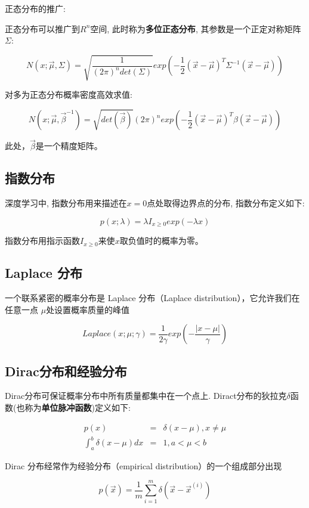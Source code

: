 正态分布的推广: 

正态分布可以推广到$R^n$空间, 此时称为{\bf 多位正态分布}, 其参数是一个正定对称矩阵$\Sigma$: 

$$
N(x;\vec\mu,\Sigma)=\sqrt{\frac{1}{(2\pi)^ndet(\Sigma)}}exp\left(-\frac{1}{2}(\vec{x}-\vec{\mu})^T\Sigma^{-1}(\vec{x}-\vec{\mu})\right)
$$

对多为正态分布概率密度高效求值: 

$$
N(x;\vec{\mu},\vec\beta^{-1}) = \sqrt{det(\vec\beta)}{(2\pi)^n}exp\left(-\frac{1}{2}(\vec{x}-\vec\mu)^T\beta(\vec{x}-\vec\mu)\right)
$$

此处，$\vec\beta$是一个精度矩阵。

\subsection{指数分布}


深度学习中, 指数分布用来描述在$x=0$点处取得边界点的分布, 指数分布定义如下:

$$
p(x;\lambda)=\lambda I_{x\geq 0}exp(-\lambda{x})
$$

指数分布用指示函数$I_{x\geq 0}$来使$x$取负值时的概率为零。

\subsection{Laplace 分布}

一个联系紧密的概率分布是 Laplace 分布（Laplace distribution），它允许我们在任意一点 $\mu$处设置概率质量的峰值

$$
Laplace(x;\mu;\gamma)=\frac{1}{2\gamma}exp\left(-\frac{|x-\mu|}{\gamma}\right)
$$

\subsection{Dirac分布和经验分布}

Dirac分布可保证概率分布中所有质量都集中在一个点上. Diract分布的狄拉克$\delta$函数(也称为{\bf 单位脉冲函数})定义如下: 

\begin{eqnarray*}
	p(x)&=&\delta(x-\mu), x\neq \mu \\
\int_{a}^{b}\delta(x-\mu)dx&=&1, a < \mu < b
\end{eqnarray*}

Dirac 分布经常作为经验分布（empirical distribution）的一个组成部分出现

$$
\hat{p}(\vec{x})=\frac{1}{m}\sum_{i=1}^{m}\delta(\vec{x}-{\vec{x}}^{(i)})
$$

